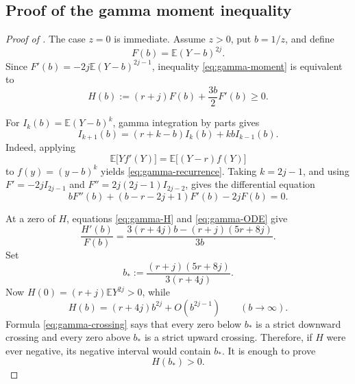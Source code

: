 \documentclass[11pt]{article}
\newcommand{\E}{\mathbb E}
\begin{document}
\subsection{Proof of the gamma moment inequality}\label{subsec:gamma-moment-proof}

\begin{proof}[Proof of ]
The case \(z=0\) is immediate.  Assume \(z>0\), put \(b=1/z\), and define
\[
       F(b)=\E(Y-b)^{2j}.
\]
Since \(F'(b)=-2j\E(Y-b)^{2j-1}\), inequality
\eqref{eq:gamma-moment} is equivalent to
\begin{equation}\label{eq:gamma-H}
       H(b):=(r+j)F(b)+\frac{3b}{2}F'(b)\ge0.
\end{equation}

For \(I_k(b)=\E(Y-b)^k\), gamma integration by parts gives
\begin{equation}\label{eq:gamma-recurrence}
       I_{k+1}(b)=(r+k-b)I_k(b)+kbI_{k-1}(b).
\end{equation}
Indeed, applying
\begin{equation}\label{eq:gamma-Stein}
       \E\bigl[Yf'(Y)\bigr]=\E\bigl[(Y-r)f(Y)\bigr]
\end{equation}
to \(f(y)=(y-b)^k\) yields \eqref{eq:gamma-recurrence}.  Taking
\(k=2j-1\), and using \(F'=-2jI_{2j-1}\) and
\(F''=2j(2j-1)I_{2j-2}\), gives the differential equation
\begin{equation}\label{eq:gamma-ODE}
       bF''(b)+(b-r-2j+1)F'(b)-2jF(b)=0.
\end{equation}

At a zero of \(H\), equations \eqref{eq:gamma-H} and
\eqref{eq:gamma-ODE} give
\begin{equation}\label{eq:gamma-crossing}
 \frac{H'(b)}{F(b)}
 =\frac{3(r+4j)b-(r+j)(5r+8j)}{3b}.
\end{equation}
Set
\begin{equation}\label{eq:gamma-bstar}
       b_*:=\frac{(r+j)(5r+8j)}{3(r+4j)}.
\end{equation}
Now \(H(0)=(r+j)\E Y^{2j}>0\), while
\[
       H(b)=(r+4j)b^{2j}+O(b^{2j-1})
       \qquad(b\to\infty).
\]
Formula \eqref{eq:gamma-crossing} says that every zero below \(b_*\) is a
strict downward crossing and every zero above \(b_*\) is a strict upward
crossing.  Therefore, if \(H\) were ever negative, its negative interval
would contain \(b_*\).  It is enough to prove
\begin{equation}\label{eq:gamma-Hbstar}
       H(b_*)>0.
\end{equation}


\end{proof}
\end{document}
